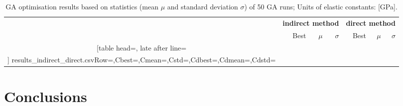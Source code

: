 \documentclass[preprint,12pt]{elsarticle}
\begin{document}

\begin{table}[h]
	\renewcommand{\arraystretch}{1.3}
	\centering \footnotesize
	\caption{GA optimisation results based on statistics (mean $\mu$ and standard deviation $\sigma$) of 50 GA runs; Units of  elastic constants: [GPa].}	
	\begin{tabular}{crrrrrr} \toprule
		&\multicolumn{3}{c}{\textbf{indirect method}} & \multicolumn{3}{c}{\textbf{direct method} }\\
		\cmidrule(lr){2-4} \cmidrule(lr){5-7} 
	&Best & $\mu$ & $\sigma$& Best& $\mu$ & $\sigma$\\
	\cmidrule(lr){2-4} \cmidrule(lr){5-7} 
		\csvreader[table head=\toprule ,
		late after line=\\ ]%
		{results_indirect_direct.csv}{Row=\constants,Cbest=\cbest,Cmean=\cmean,Cstd=\cstd,Cdbest=\cdbest,Cdmean=\cdmean,Cdstd=\cdstd}%
		{\constants & \cbest & \cmean & \cstd& \cdbest & \cdmean & \cdstd}%
		\bottomrule
	\end{tabular}	
	\label{tab:csv_results}
\end{table}
	\section{Conclusions}
\end{document}
